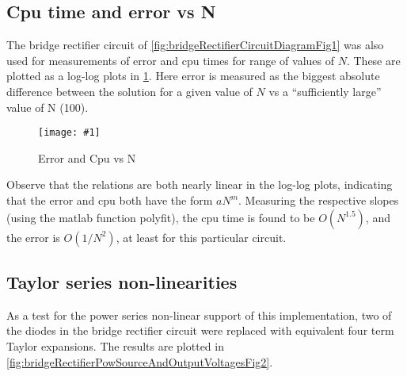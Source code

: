 \documentclass[12pt,journal,compsoc]{../ieeepaper/IEEEtran}
\newcommand{\imageFigureHere}[4]{%
\begin{figure}[!h]%
\centering%
\texttt{[image: \#1]}%
\caption{#2}%
\label{#3}%
\end{figure}%
}
\begin{document}
\subsection{Cpu time and error vs N}

The bridge rectifier circuit of
\cref{fig:bridgeRectifierCircuitDiagramFig1} was also used for
measurements of error and cpu times for range of values of \( N \).  These are plotted as a log-log plots in 
\cref{fig:bridgeRectifierFig5}.
Here error is measured as the biggest absolute difference between the solution for a given value of \( N \) vs 
a ``sufficiently large'' value of N (100).

\imageFigureHere{../../figures/ece1254/report/bridgeRectifierErrorAndCpuTimesFig5}{Error and Cpu vs N}{fig:bridgeRectifierFig5}{3.0in}

Observe that the relations are both nearly linear in the log-log plots, indicating that the error and cpu both have the form \( a N^m \).  Measuring the respective slopes (using the matlab function polyfit), the cpu time is found to be \( O(N^{1.5}) \), and the error is \( O(1/N^2) \), at least for this particular circuit.


\subsection{Taylor series non-linearities}

As a test for the power series non-linear support of this implementation, two of the diodes in the bridge rectifier circuit were replaced with equivalent four term Taylor expansions.  The results are plotted in \cref{fig:bridgeRectifierPowSourceAndOutputVoltagesFig2}.
\end{document}
